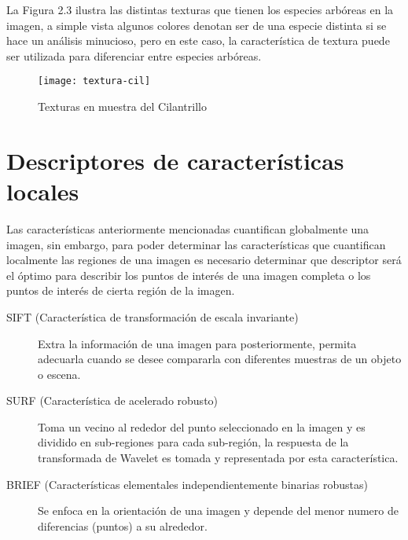 La Figura 2.3 ilustra las distintas texturas que tienen los especies arbóreas en la imagen, a simple vista algunos colores denotan ser de una especie distinta si se hace un análisis minucioso, pero en este caso, la característica de textura puede ser utilizada para diferenciar entre especies arbóreas.

\begin{figure}[h!]
  \centering
  \begin{minipage}[b]{0.7\textwidth}
    \texttt{[image: textura-cil]}
    \caption{Texturas en muestra del Cilantrillo}
  \end{minipage}
\end{figure}

\section{Descriptores de características locales}
Las características anteriormente mencionadas cuantifican globalmente una imagen, sin embargo, para poder determinar las características que cuantifican localmente las regiones de una imagen es necesario determinar que descriptor será el óptimo para describir los puntos de interés de una imagen completa o los puntos de interés de cierta región de la imagen. 

\begin{description}
\item[SIFT (Característica de transformación de escala invariante)]{Extra la información de una imagen para posteriormente, permita adecuarla cuando se desee compararla con diferentes muestras de un objeto o escena.}
\end{description}

\begin{description}
\item[SURF (Característica de acelerado robusto)]{Toma un vecino al rededor del punto seleccionado en la imagen y es dividido en sub-regiones para cada sub-región, la respuesta de la transformada de Wavelet es tomada y representada por esta característica.}
\end{description}
 
\begin{description}
\item[BRIEF (Características elementales  independientemente binarias robustas)]{Se enfoca en la orientación de una imagen y depende del menor numero de diferencias (puntos) a su alrededor.}
\end{description}

